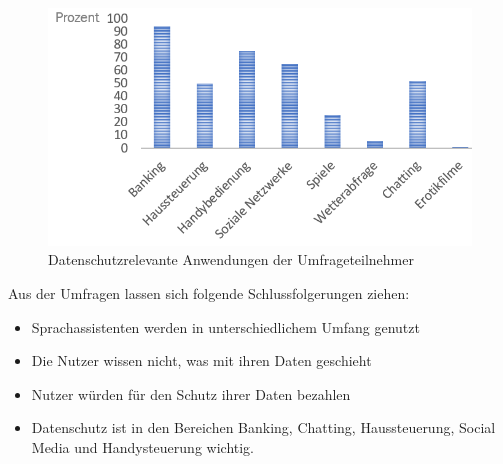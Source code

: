 \begin{figure}[!h]
	\centering
	\includegraphics[width=0.9\linewidth]{Picture/umfrage_anwendung}
	\caption[Datenschutzrelevante Anwendungen der Umfrageteilnehmers]{Datenschutzrelevante Anwendungen der Umfrageteilnehmer}
	\label{fig:umfrage_anwendung}
\end{figure}

Aus der Umfragen lassen sich folgende Schlussfolgerungen ziehen:
\begin{itemize}	
	\item Sprachassistenten werden in unterschiedlichem Umfang genutzt
	\item Die Nutzer wissen nicht, was mit ihren Daten geschieht
	\item Nutzer würden für den Schutz ihrer Daten bezahlen
	\item Datenschutz ist in den Bereichen Banking, Chatting, Haussteuerung, Social Media und Handysteuerung wichtig.
\end{itemize}
